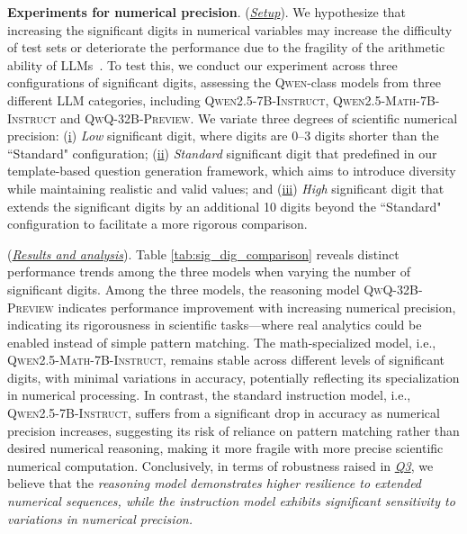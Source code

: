 \textbf{Experiments for numerical precision}. (\textit{\underline{Setup}}).
We hypothesize that increasing the significant digits in numerical variables may increase the difficulty of test sets or deteriorate the performance due to the fragility of the arithmetic ability of LLMs~\cite{yang2024number, schwartz2024numerologic, singh2024tokenization}.
To test this, we conduct our experiment across three configurations of significant digits, assessing the \textsc{Qwen}-class models from three different LLM categories, including \textsc{Qwen2.5-7B-Instruct},  \textsc{Qwen2.5-Math-7B-Instruct} and \textsc{QwQ-32B-Preview}.
We variate three degrees of scientific numerical precision: (\underline{i}) \textit{Low} significant digit, where digits are 0–3 digits shorter than the ``Standard" configuration; (\underline{ii}) \textit{Standard} significant digit that predefined in our template-based question generation framework, which aims to introduce diversity while maintaining realistic and valid values; and  (\underline{iii}) \textit{High} significant digit that extends the significant digits by an additional 10 digits beyond the ``Standard" configuration to facilitate a more rigorous comparison. 

(\textit{\underline{Results and analysis}}). 
Table \ref{tab:sig_dig_comparison} reveals distinct performance trends among the three models when varying the number of significant digits. Among the three models, the reasoning model 	\textsc{QwQ-32B-Preview} indicates performance improvement with increasing numerical precision, indicating its rigorousness in scientific tasks---where real analytics could be enabled instead of simple pattern matching. The math-specialized model, i.e., \textsc{Qwen2.5-Math-7B-Instruct}, remains stable across different levels of significant digits, with minimal variations in accuracy, potentially reflecting its specialization in numerical processing. In contrast, the standard instruction model, i.e., \textsc{Qwen2.5-7B-Instruct}, suffers from a significant drop in accuracy as numerical precision increases, suggesting its risk of reliance on pattern matching rather than desired numerical reasoning, making it more fragile with more precise scientific numerical computation.
Conclusively, in terms of robustness raised in \textit{\underline{Q3}}, we believe that the \textit{reasoning model demonstrates higher resilience to extended numerical sequences, while the instruction model exhibits significant sensitivity to variations in numerical precision.}



